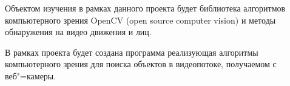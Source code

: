 Объектом изучения в рамках данного проекта будет библиотека алгоритмов компьютерного зрения OpenCV (open source computer vision) и методы обнаружения на видео движения и лиц.

В рамках проекта будет создана программа реализующая алгоритмы компьютерного зрения для поиска объектов в видеопотоке, получаемом с веб"=камеры. 
